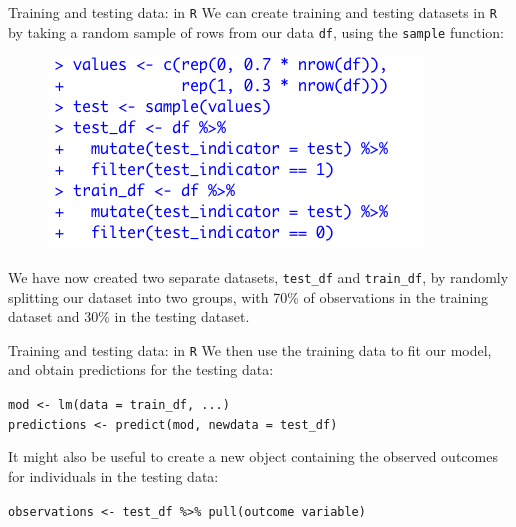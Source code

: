 \documentclass[10pt,t]{beamer}
\begin{document}
\begin{frame}{Training and testing data: in \texttt{R}}
	We can create training and testing datasets in \texttt{R} by taking a random sample of rows from our data \texttt{df}, using the \texttt{sample} function:
	
	\vspace{0.1cm}
	
	\begin{figure}
		\centering \includegraphics[scale=0.5]{figures/traintest.png}
	\end{figure}
	
	\vspace{0.1cm}
	
	We have now created two separate datasets, \texttt{test\_df} and \texttt{train\_df}, by randomly splitting our dataset into two groups, with 70\% of observations in the training dataset and 30\% in the testing dataset.
	
\end{frame}

\begin{frame}{Training and testing data: in \texttt{R}}
	We then use the training data to fit our model, and obtain predictions for the testing data:
	
	\vspace{0.3cm}
	
	\texttt{mod <- lm(data = train\_df, ...)} \\
	\texttt{predictions <- predict(mod, newdata = test\_df)}
	
	\vspace{0.3cm}  
	
	It might also be useful to create a new object containing the observed outcomes for individuals in the testing data:
	
	\vspace{0.3cm}
	
	\texttt{observations <- test\_df \%>\% pull(outcome variable)}
	
\end{frame}
\end{document}
